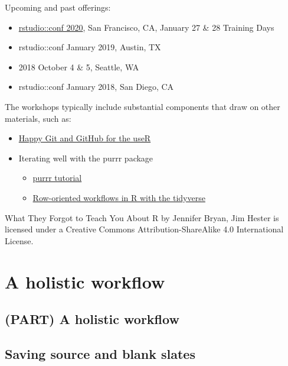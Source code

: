 \documentclass[
  letterpaper,
]{book}
\providecommand{\tightlist}{%
  \setlength{\itemsep}{0pt}\setlength{\parskip}{0pt}}\usepackage{longtable,booktabs,array}
\begin{document}
Upcoming and past offerings:

\begin{itemize}
\tightlist
\item
  \href{https://rstudio.com/conference/}{rstudio::conf 2020}, San
  Francisco, CA, January 27 \& 28 Training Days
\item
  rstudio::conf January 2019, Austin, TX
\item
  2018 October 4 \& 5, Seattle, WA
\item
  rstudio::conf January 2018, San Diego, CA
\end{itemize}

The workshops typically include substantial components that draw on
other materials, such as:

\begin{itemize}
\tightlist
\item
  \href{https://happygitwithr.com}{Happy Git and GitHub for the useR}
\item
  Iterating well with the purrr package

  \begin{itemize}
  \tightlist
  \item
    \href{https://jennybc.github.io/purrr-tutorial/}{purrr tutorial}
  \item
    \href{https://github.com/jennybc/row-oriented-workflows\#readme}{Row-oriented
    workflows in R with the tidyverse}
  \end{itemize}
\end{itemize}

{What They Forgot to Teach You About R} by Jennifer Bryan, Jim Hester is
licensed under a Creative Commons Attribution-ShareAlike 4.0
International License.

\part{A holistic workflow}

\hypertarget{part-a-holistic-workflow}{%
\chapter*{(PART) A holistic workflow}\label{part-a-holistic-workflow}}

\hypertarget{save-source}{%
\chapter*{Saving source and blank slates}\label{save-source}}
\end{document}
